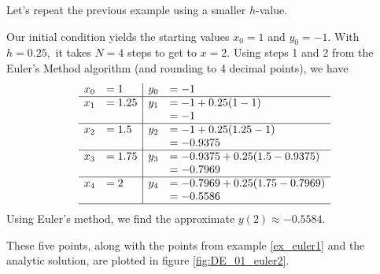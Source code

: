 Let's repeat the previous example using a smaller $h$-value.\\

{Our initial condition yields the starting values $x_0 = 1$ and $y_0 = -1$.  With $h = 0.25,$ it takes $N=4$ steps to get to $x=2.$  Using steps 1 and 2 from the Euler's Method algorithm (and rounding to 4 decimal points), we have
\[
\begin{array}{rl | rl}
x_0  &= 1			& 	y_0	&= -1\\ \hline
x_1 	&= 1.25		&	y_1 	&= -1 + 0.25(1 - 1)\\
	&			&		&= -1\\ \hline
x_2 	&= 1.5 		& 	y_2 	&= -1 + 0.25(1.25-1)\\
	&			&		&= -0.9375\\ \hline
x_3	&= 1.75		&	y_3 	&= -0.9375 + 0.25(1.5-0.9375)\\
	&			&		&= -0.7969\\ \hline
x_4	&= 2			&	y_4	&= -0.7969 + 0.25(1.75 - 0.7969)\\
	&			&		&= -0.5586\\ \hline
\end{array}
\]
Using Euler's method, we find the approximate $y(2) \approx -0.5584.$

These five points, along with the points from example \ref{ex_euler1} and the analytic solution, are plotted in figure \ref{fig:DE_01_euler2}.
}\\


